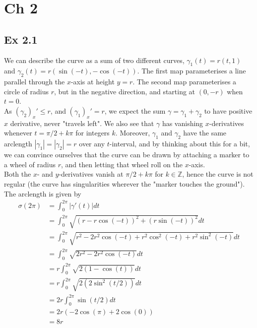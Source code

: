 \documentclass{article}
\theoremstyle{definition}
\newcommand{\Z}{\mathbb{Z}}
\begin{document}
\section*{Ch 2}

\subsection*{Ex 2.1}

We can describe the curve as a sum of two different curves, $\gamma_1(t) = r(t,
1)$ and $\gamma_2(t) = r (\sin(-t), -\cos(-t))$. The first map parameterises a
line parallel through the $x$-axis at height $y = r$. The second map
parameterises a circle of radius $r$, but in the negative direction, and
starting at $(0, -r)$ when $t = 0$. \\

As $(\gamma_2)_x' \leq r$, and $(\gamma_1)_x' = r$, we expect the sum $\gamma =
\gamma_1 + \gamma_2$ to have positive $x$ derivative, never "travels left". We
also see that $\gamma$ has vanishing $x$-derivatives whenever $t = \pi/2 + k
\pi$ for integers $k$. Moreover, $\gamma_1$ and $\gamma_2$ have the same
arclength $|\gamma_1| = |\gamma_2| = r$ over any $t$-interval, and by thinking
about this for a bit, we can convince ourselves that the curve can be drawn by
attaching a marker to a wheel of radius $r$, and then letting that wheel roll
on the $x$-axis. \\

Both the $x$- and $y$-derivatives vanish at $\pi/2 + k\pi$ for $k \in \Z$,
hence the curve is not regular (the curve has singularities wherever the
"marker touches the ground"). \\

The arclength is given by 
\begin{align*}
	\sigma(2\pi)
	&=
	\int_{0}^{2\pi}
	|\gamma'(t)| dt \\
	&=
	\int_{0}^{2\pi}
	\sqrt{(r - r\cos(-t))^2 + (r\sin(-t))^2} dt \\
	&=
	\int_{0}^{2\pi}
	\sqrt{r^2 - 2r^2\cos(-t) + r^2\cos^2(-t) + r^2\sin^2(-t)} dt \\
	&=
	\int_{0}^{2\pi}
	\sqrt{2r^2 - 2r^2\cos(-t)} dt \\
	&=
	r
	\int_{0}^{2\pi}
	\sqrt{2(1 - \cos(t))} dt \\
	&=
	r
	\int_{0}^{2\pi}
	\sqrt{2(2\sin^2(t/2))} dt \\
	&=
	2r
	\int_{0}^{2\pi}
	\sin(t/2) dt \\
	&=
	2r(-2\cos(\pi) + 2\cos(0)) \\
	&=
	8r
\end{align*} 
\end{document}
